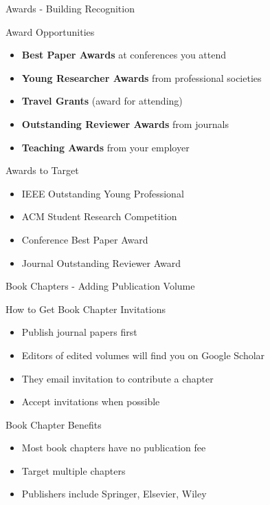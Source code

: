 \documentclass[11pt]{beamer}
\begin{document}
	\begin{frame}{Awards - Building Recognition}
		\scriptsize
		\begin{block}{Award Opportunities}
			\begin{itemize}
				\item \textbf{Best Paper Awards} at conferences you attend
				\item \textbf{Young Researcher Awards} from professional societies
				\item \textbf{Travel Grants} (award for attending)
				\item \textbf{Outstanding Reviewer Awards} from journals
				\item \textbf{Teaching Awards} from your employer
			\end{itemize}
		\end{block}
		\begin{block}{Awards to Target}
			\begin{itemize}
				\item IEEE Outstanding Young Professional
				\item ACM Student Research Competition
				\item Conference Best Paper Award
				\item Journal Outstanding Reviewer Award
			\end{itemize}
		\end{block}
	\end{frame}
	
	\begin{frame}{Book Chapters - Adding Publication Volume}
		\scriptsize
		\begin{block}{How to Get Book Chapter Invitations}
			\begin{itemize}
				\item Publish journal papers first
				\item Editors of edited volumes will find you on Google Scholar
				\item They email invitation to contribute a chapter
				\item Accept invitations when possible
			\end{itemize}
		\end{block}
		\begin{block}{Book Chapter Benefits}
			\begin{itemize}
				\item Most book chapters have no publication fee
				\item Target multiple chapters
				\item Publishers include Springer, Elsevier, Wiley
			\end{itemize}
		\end{block}
	\end{frame}
	
\end{document}
